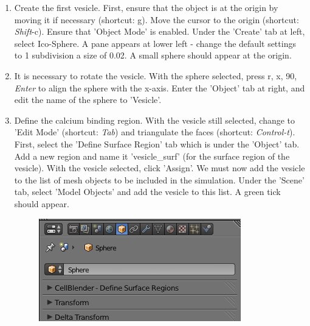 \documentclass[twoside,a4paper]{refart}
\begin{document}
\begin{enumerate}
\item   Create the first vesicle. First, ensure that the object is at the origin by moving it if necessary (shortcut: g). Move the cursor to the origin (shortcut: \textit{Shift}-c). Ensure that 'Object Mode' is enabled. Under the 'Create' tab at left, select Ico-Sphere. A pane appears at lower left - change the default settings to 1 subdivision a size of 0.02. A small sphere should appear at the origin.

\item   It is necessary to rotate the vesicle. With the sphere selected, press r, x, 90, \textit{Enter} to align the sphere with the x-axis. Enter the 'Object' tab at right, and edit the name of the sphere to 'Vesicle'.

\item   Define the calcium binding region. With the vesicle still selected, change to 'Edit Mode' (shortcut: \textit{Tab}) and triangulate the faces (shortcut: \textit{Control-t}). First, select the 'Define Surface Region' tab which is under the 'Object' tab. Add a new region and name it 'vesicle\_surf' (for the surface region of the vesicle). With the vesicle selected, click 'Assign'. We must now add the vesicle to the list of mesh objects to be included in the simulation. Under the 'Scene' tab, select 'Model Objects' and add the vesicle to this list. A green tick should appear.
        \begin{figure}[H]
        \includegraphics[scale=0.5]{vesicle1.png}
        \end{figure}


\end{enumerate}
\end{document}

